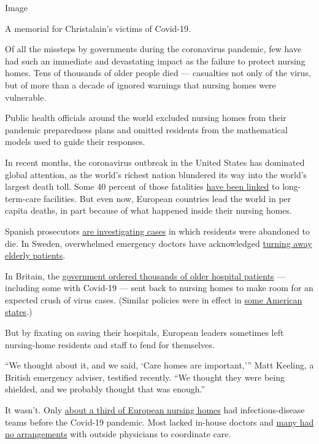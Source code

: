 Image

A memorial for Christalain's victims of Covid-19.

Of all the missteps by governments during the coronavirus pandemic, few
have had such an immediate and devastating impact as the failure to
protect nursing homes. Tens of thousands of older people died ---
casualties not only of the virus, but of more than a decade of ignored
warnings that nursing homes were vulnerable.

Public health officials around the world excluded nursing homes from
their pandemic preparedness plans and omitted residents from the
mathematical models used to guide their responses.

In recent months, the coronavirus outbreak in the United States has
dominated global attention, as the world's richest nation blundered its
way into the world's largest death toll. Some 40 percent of those
fatalities
\href{https://www.kff.org/health-costs/issue-brief/state-data-and-policy-actions-to-address-coronavirus/\#stateleveldata}{have
been linked} to long-term-care facilities. But even now, European
countries lead the world in per capita deaths, in part because of what
happened inside their nursing homes.

Spanish prosecutors
\href{https://www.nytimes.com/2020/03/25/world/europe/Spain-coronavirus-nursing-homes.html}{are
investigating cases} in which residents were abandoned to die. In
Sweden, overwhelmed emergency doctors have acknowledged
\href{https://www.dn.se/nyheter/sverige/overlakare-logn-att-patienter-inte-prioriterats-bort/}{turning
away elderly patients}.

In Britain, the
\href{https://www.independent.co.uk/news/health/coronavirus-care-homes-nhs-hospital-discharges-deaths-a9544671.html}{government
ordered thousands of older hospital patients} --- including some with
Covid-19 --- sent back to nursing homes to make room for an expected
crush of virus cases. (Similar policies were in effect in
\href{https://www.nytimes.com/2020/04/24/us/nursing-homes-coronavirus.html}{some
American states}.)

But by fixating on saving their hospitals, European leaders sometimes
left nursing-home residents and staff to fend for themselves.

``We thought about it, and we said, `Care homes are important,''' Matt
Keeling, a British emergency adviser, testified recently. ``We thought
they were being shielded, and we probably thought that was enough.''

It wasn't. Only
\href{https://www.ecdc.europa.eu/sites/default/files/documents/covid-19-long-term-care-facilities-surveillance-guidance.pdf}{about
a third of European nursing homes} had infectious-disease teams before
the Covid-19 pandemic. Most lacked in-house doctors and
\href{https://www.ecdc.europa.eu/sites/default/files/media/en/publications/Publications/healthcare-associated-infections-point-prevalence-survey-long-term-care-facilities-2013.pdf}{many
had no arrangements} with outside physicians to coordinate care.

